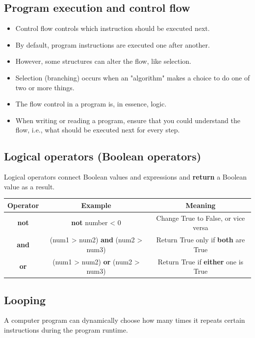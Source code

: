 \documentclass[11pt]{article}
\begin{document}
\subsection{Program execution and control flow}
\label{sec:org5a4accf}
\begin{itemize}
\item Control flow controls which instruction should be executed next.
\item By default, program instructions are executed one after another.
\item However, some structures can alter the flow, like selection.
\item Selection (branching) occurs when an "algorithm" makes a choice to do one of two or more things.
\item The flow control in a program is, in essence, logic.
\item When writing or reading a program, ensure that you could understand the flow, i.e., what should be executed next for every step.
\end{itemize}

\subsection{Logical operators (Boolean operators)}
\label{sec:org54395e7}
Logical operators connect Boolean values and expressions and \textbf{return} a Boolean value as a result.

\begin{center}
\begin{tabular}{c|c|c}
Operator & Example & Meaning\\[0pt]
\hline
\textbf{not} & \textbf{not} number < 0 & Change True to False, or vice versa\\[0pt]
\textbf{and} & (num1 > num2) \textbf{and} (num2 > num3) & Return True only if \textbf{both} are True\\[0pt]
\textbf{or} & (num1 > num2) \textbf{or} (num2 > num3) & Return True if \textbf{either} one is True\\[0pt]
\end{tabular}
\end{center}

 \newpage

\subsection{Looping}
\label{sec:org3488a26}
A computer program can dynamically choose how many times it repeats certain instructions during the program runtime.
\end{document}
